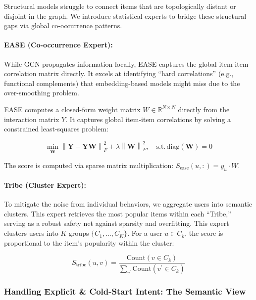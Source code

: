 Structural models struggle to connect items that are topologically distant or disjoint in the graph. We introduce statistical experts to bridge these structural gaps via global co-occurrence patterns.

\paragraph{EASE (Co-occurrence Expert):} While GCN propagates information locally, EASE captures the global item-item correlation matrix directly. It excels at identifying ``hard correlations'' (e.g., functional complements) that embedding-based models might miss due to the over-smoothing problem.

EASE computes a closed-form weight matrix $W \in \mathbb{R}^{N \times N}$ directly from the interaction matrix $Y$. It captures global item-item correlations by solving a constrained least-squares problem:

\begin{equation}
\min_{\mathbf{W}}\left\| \mathbf{Y} - \mathbf{YW} \right\|_{F}^{2} + \lambda\left\| \mathbf{W} \right\|_{F}^{2},\quad\mathrm{s.t.}\,\mathrm{diag}\left( \mathbf{W} \right) = 0
\end{equation}

The score is computed via sparse matrix multiplication: $S_{\mathrm{ease}}\left( u,: \right) = y_{u} \cdot W$.

\paragraph{Tribe (Cluster Expert):} To mitigate the noise from individual behaviors, we aggregate users into semantic clusters. This expert retrieves the most popular items within each ``Tribe,'' serving as a robust safety net against sparsity and overfitting. This expert clusters users into $K$ groups $\{ C_{1},\ldots,C_{K}\}$. For a user $u \in C_{k}$, the score is proportional to the item's popularity within the cluster:

\begin{equation}
S_{\mathrm{tribe}}\left( u,v \right) = \frac{\mathrm{Count}\left( v \in C_{k} \right)}{\sum_{v^{\prime}}^{}\mathrm{Count}\left( v^{\prime} \in C_{k} \right)}
\end{equation}

\subsubsection{Handling Explicit \& Cold-Start Intent: The Semantic View}

